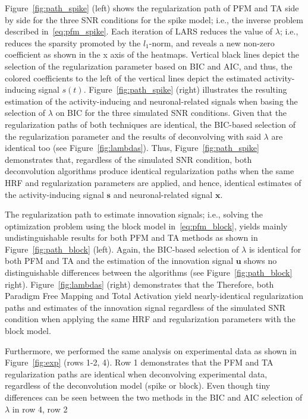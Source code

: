 Figure~\ref{fig:path_spike} (left) shows the regularization path of PFM and TA side by side for the three SNR conditions for the spike model; i.e., the inverse problem described in~\eqref{eq:pfm_spike}. Each iteration of LARS reduces the value of \(\lambda\); i.e., reduces the sparsity promoted by the \(l_1\)-norm, and reveals a new non-zero coefficient as shown in the x axis of the heatmaps. Vertical black lines depict the selection of the regularization parameter based on BIC and AIC, and thus, the colored coefficients to the left of the vertical lines depict the estimated activity-inducing signal \(s(t)\). Figure~\ref{fig:path_spike} (right) illustrates the resulting estimation of the activity-inducing and neuronal-related signals when basing the selection of \(\lambda\) on BIC for the three simulated SNR conditions. Given that the regularization paths of both techniques are identical, the BIC-based selection of the regularization parameter and the results of deconvolving with said \(\lambda\) are identical too (see Figure~\ref{fig:lambdas}). Thus, Figure~\ref{fig:path_spike} demonstrates that, regardless of the simulated SNR condition, both deconvolution algorithms produce identical regularization paths when the same HRF and regularization parameters are applied, and hence, identical estimates of the activity-inducing signal \(\mathbf{s}\) and neuronal-related signal \(\mathbf{x}\).

The regularization path to estimate innovation signals; i.e., solving the optimization problem using the block model in~\eqref{eq:pfm_block}, yields mainly undistinguishable results for both PFM and TA methods as shown in Figure~\ref{fig:path_block} (left). Again, the BIC-based selection of \(\lambda\) is identical for both PFM and TA and the estimation of the innovation signal \(\mathbf{u}\) shows no distinguishable differences between the algorithms (see Figure~\ref{fig:path_block} right). Figure~\ref{fig:lambdas} (right) demonstrates that the  Therefore, both Paradigm Free Mapping and Total Activation yield nearly-identical regularization paths and estimates of the innovation signal regardless of the simulated SNR condition when applying the same HRF and regularization parameters with the block model.

Furthermore, we performed the same analysis on experimental data as shown in Figure~\ref{fig:exp} (rows 1-2, 4). Row 1 demonstrates that the PFM and TA regularization paths are identical when deconvolving experimental data, regardless of the deconvolution model (spike or block). Even though tiny differences can be seen between the two methods in the BIC and AIC selection of \(\lambda\) in row 4, row 2 
